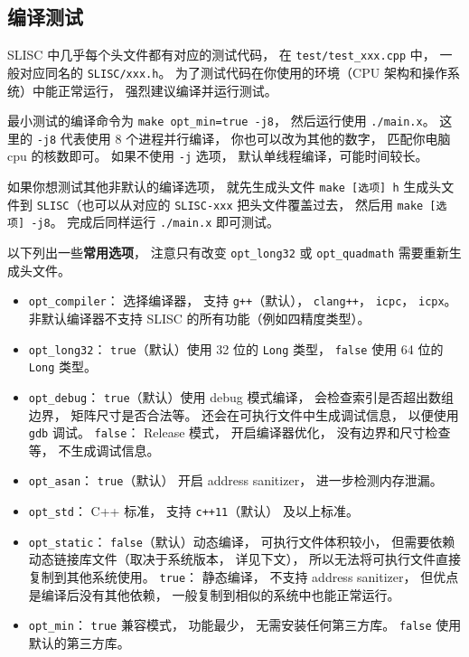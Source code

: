 \subsection{编译测试}
SLISC 中几乎每个头文件都有对应的测试代码， 在 \verb`test/test_xxx.cpp` 中， 一般对应同名的 \verb`SLISC/xxx.h`。 为了测试代码在你使用的环境（CPU 架构和操作系统）中能正常运行， 强烈建议编译并运行测试。

最小测试的编译命令为 \verb`make opt_min=true -j8`， 然后运行使用 \verb`./main.x`。 这里的 \verb`-j8` 代表使用 8 个进程并行编译， 你也可以改为其他的数字， 匹配你电脑 cpu 的核数即可。 如果不使用 \verb`-j` 选项， 默认单线程编译，可能时间较长。

如果你想测试其他非默认的编译选项， 就先生成头文件 \verb`make [选项] h` 生成头文件到 \verb`SLISC`（也可以从对应的 \verb`SLISC-xxx` 把头文件覆盖过去， 然后用 \verb`make [选项] -j8`。 完成后同样运行 \verb`./main.x` 即可测试。

以下列出一些\textbf{常用选项}， 注意只有改变 \verb`opt_long32` 或 \verb`opt_quadmath` 需要重新生成头文件。
\begin{itemize}
\item \verb`opt_compiler`： 选择编译器， 支持 \verb`g++`（默认）， \verb`clang++`， \verb`icpc`， \verb`icpx`。 非默认编译器不支持 SLISC 的所有功能（例如四精度类型）。
\item \verb`opt_long32`： \verb`true`（默认）使用 32 位的 \verb`Long` 类型， \verb`false` 使用 64 位的 \verb`Long` 类型。
\item \verb`opt_debug`： \verb`true`（默认）使用 debug 模式编译， 会检查索引是否超出数组边界， 矩阵尺寸是否合法等。 还会在可执行文件中生成调试信息， 以便使用 \verb`gdb` 调试。 \verb`false`： Release 模式， 开启编译器优化， 没有边界和尺寸检查等， 不生成调试信息。
\item \verb`opt_asan`： \verb`true`（默认） 开启 address sanitizer， 进一步检测内存泄漏。
\item \verb`opt_std`： C++ 标准， 支持 \verb`c++11`（默认） 及以上标准。
\item \verb`opt_static`： \verb`false`（默认）动态编译， 可执行文件体积较小， 但需要依赖动态链接库文件（取决于系统版本， 详见下文）， 所以无法将可执行文件直接复制到其他系统使用。 \verb`true`： 静态编译， 不支持 address sanitizer， 但优点是编译后没有其他依赖， 一般复制到相似的系统中也能正常运行。
\item \verb`opt_min`： \verb`true` 兼容模式， 功能最少， 无需安装任何第三方库。 \verb`false` 使用默认的第三方库。
\end{itemize}


